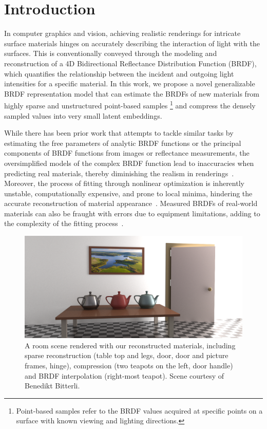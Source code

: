 \section{Introduction}
\label{sec:intro}


In computer graphics and vision, achieving realistic renderings for intricate surface materials hinges on accurately describing the interaction of light with the surfaces. This is conventionally conveyed through the modeling and reconstruction of a 4D Bidirectional Reflectance Distribution Function (BRDF), which quantifies the relationship between the incident and outgoing light intensities for a specific material. In this work, we propose a novel generalizable BRDF representation model that can estimate the BRDFs of new materials from highly sparse and unstructured point-based samples \footnote{Point-based samples refer to the BRDF values acquired at specific points on a surface with known viewing and lighting directions.} and compress the densely sampled values into very small latent embeddings.


While there has been prior work that attempts to tackle similar tasks by estimating the free parameters of analytic BRDF functions or the principal components of BRDF functions from images or reflectance measurements, the oversimplified models of the complex BRDF function lead to inaccuracies when predicting real materials, thereby diminishing the realism in renderings~\cite{ngan2005}. Moreover, the process of fitting through nonlinear optimization is inherently unstable, computationally expensive, and prone to local minima, hindering the accurate reconstruction of material appearance~\cite{dupuy2015, guarnera2016}. Measured BRDFs of real-world materials can also be fraught with errors due to equipment limitations, adding to the complexity of the fitting process~\cite{nielsen2015optimal}. 

\begin{figure}
  \centering
   \includegraphics[width=\linewidth]{Chapters/hyperbrdf-figs/teaser_cropped.png}
   \caption{A room scene rendered with our reconstructed materials, including sparse reconstruction (table top and legs, door, door and picture frames, hinge), compression (two teapots on the left, door handle) and BRDF interpolation (right-most teapot). Scene courtesy of Benedikt Bitterli.}
   \label{fig:teaser}
\end{figure}

